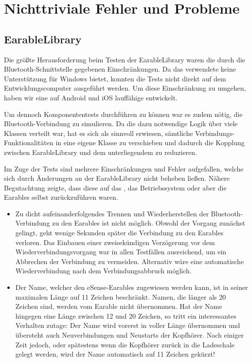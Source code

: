 \documentclass[../implementierung.tex]{subfiles}
\begin{document}
\section{Nichttriviale Fehler und Probleme}
\subsection{EarableLibrary}
Die größte Herausforderung beim Testen der EarableLibrary waren die durch die Bluetooth-Schnittstelle gegebenen Einschränkungen.
Da das verwendete  keine Unterstützung für Windows bietet, konnten die Tests nicht direkt auf dem Entwicklungscomputer ausgeführt werden.
Um diese Einschränkung zu umgehen, haben wir eine auf Android und iOS lauffähige  entwickelt.

Um dennoch Komponententests durchführen zu können war es zudem nötig, die Bluetooth-Verbindung zu simulieren.
Da die dazu notwendige Logik über viele Klassen verteilt war, hat es sich als sinnvoll erwiesen, sämtliche Verbindungs-Funktionalitäten in eine eigene Klasse
 zu verschieben und dadurch die Kopplung zwischen EarableLibrary und dem unterliegendem  zu reduzieren.

Im Zuge der Tests sind mehrere Einschränkungen und Fehler aufgefallen, welche sich durch Änderungen an der EarableLibrary nicht beheben ließen.
Nähere Begutachtung zeigte, dass diese auf das , das Betriebssystem oder aber die Earables selbst zurückzuführen waren.
\begin{itemize}
\item Zu dicht aufeinanderfolgendes Trennen und Wiederherstellen der Bluetooth-Verbindung zu den Earables ist nicht möglich. Obwohl der Vorgang zunächst gelingt, geht wenige Sekunden später die Verbindung zu den Earables verloren.
Das Einbauen einer zweisekündigen Verzögerung vor dem Wiederverbindungsvorgang war in allen Testfällen ausreichend, um ein Abbrechen der Verbindung zu vermeiden.
Alternativ wäre eine automatische Wiederverbindung nach dem Verbindungsabbruch möglich.
\item Der Name, welcher den eSense-Earables zugewiesen werden kann, ist in seiner maximalen Länge auf 11 Zeichen beschränkt.
Namen, die länger als 20 Zeichen sind, werden vom Earable nicht übernommen.
Hat der Name hingegen eine Länge zwischen 12 und 20 Zeichen, so tritt ein interessantes Verhalten zutage:
Der Name wird vorerst in voller Länge übernommen und übersteht auch Neuverbindungen und Neustarts der Kopfhörer.
Nach einiger Zeit jedoch, oder spätestens wenn die Kopfhörer zurück in die Ladeschale gelegt werden, wird der Name automatisch auf 11 Zeichen gekürzt!
\end{itemize}
\end{document}
